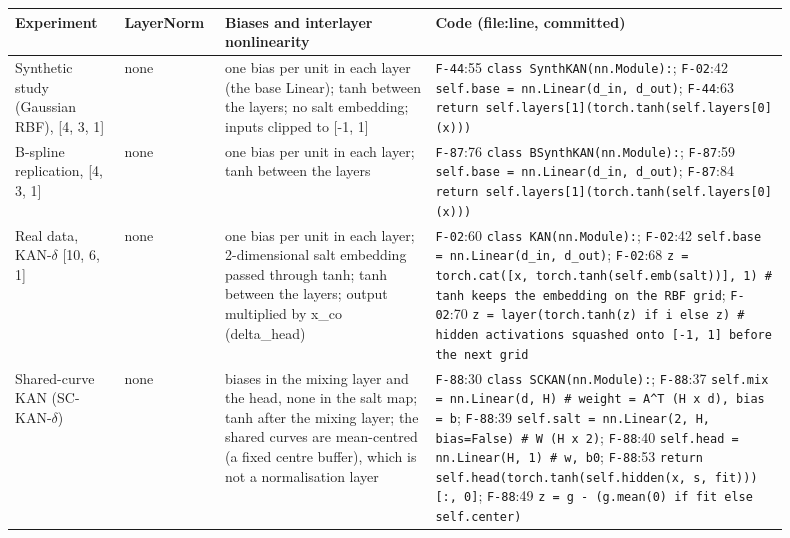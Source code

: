 {\footnotesize\setlength{\tabcolsep}{3pt}
\begin{longtable}{R{0.13\linewidth} R{0.10\linewidth} R{0.25\linewidth} R{0.42\linewidth}}
\toprule
Experiment & LayerNorm & Biases and interlayer nonlinearity & Code (file:line, committed) \\
\midrule
\endhead
Synthetic study (Gaussian RBF), [4, 3, 1] & none & one bias per unit in each layer (the base Linear); tanh between the layers; no salt embedding; inputs clipped to [-1, 1] & \texttt{F-44}:55 \texttt{class SynthKAN(\allowbreak{}nn.Module):}; \texttt{F-02}:42 \texttt{self.base = nn.Linear(\allowbreak{}d\_in, \allowbreak{}d\_out)}; \texttt{F-44}:63 \texttt{return self.layers[1](\allowbreak{}torch.tanh(\allowbreak{}self.layers[0](\allowbreak{}x)))} \\
B-spline replication, [4, 3, 1] & none & one bias per unit in each layer; tanh between the layers & \texttt{F-87}:76 \texttt{class BSynthKAN(\allowbreak{}nn.Module):}; \texttt{F-87}:59 \texttt{self.base = nn.Linear(\allowbreak{}d\_in, \allowbreak{}d\_out)}; \texttt{F-87}:84 \texttt{return self.layers[1](\allowbreak{}torch.tanh(\allowbreak{}self.layers[0](\allowbreak{}x)))} \\
Real data, KAN-$\delta$ [10, 6, 1] & none & one bias per unit in each layer; 2-dimensional salt embedding passed through tanh; tanh between the layers; output multiplied by x\_co (delta\_head) & \texttt{F-02}:60 \texttt{class KAN(\allowbreak{}nn.Module):}; \texttt{F-02}:42 \texttt{self.base = nn.Linear(\allowbreak{}d\_in, \allowbreak{}d\_out)}; \texttt{F-02}:68 \texttt{z = torch.cat(\allowbreak{}[x, \allowbreak{}torch.tanh(\allowbreak{}self.emb(\allowbreak{}salt))], \allowbreak{}1)  \# tanh keeps the embedding on the RBF grid}; \texttt{F-02}:70 \texttt{z = layer(\allowbreak{}torch.tanh(\allowbreak{}z) if i else z)  \# hidden activations squashed onto [-1, \allowbreak{}1] before the next grid} \\
Shared-curve KAN (SC-KAN-$\delta$) & none & biases in the mixing layer and the head, none in the salt map; tanh after the mixing layer; the shared curves are mean-centred (a fixed centre buffer), which is not a normalisation layer & \texttt{F-88}:30 \texttt{class SCKAN(\allowbreak{}nn.Module):}; \texttt{F-88}:37 \texttt{self.mix = nn.Linear(\allowbreak{}d, \allowbreak{}H)                                       \# weight = A\^{}T (\allowbreak{}H x d), \allowbreak{}bias = b}; \texttt{F-88}:39 \texttt{self.salt = nn.Linear(\allowbreak{}2, \allowbreak{}H, \allowbreak{}bias=False)                          \# W (\allowbreak{}H x 2)}; \texttt{F-88}:40 \texttt{self.head = nn.Linear(\allowbreak{}H, \allowbreak{}1)                                      \# w, \allowbreak{}b0}; \texttt{F-88}:53 \texttt{return self.head(\allowbreak{}torch.tanh(\allowbreak{}self.hidden(\allowbreak{}x, \allowbreak{}s, \allowbreak{}fit)))[:, \allowbreak{}0]}; \texttt{F-88}:49 \texttt{z = g - (\allowbreak{}g.mean(\allowbreak{}0) if fit else self.center)} \\

\end{longtable}}
